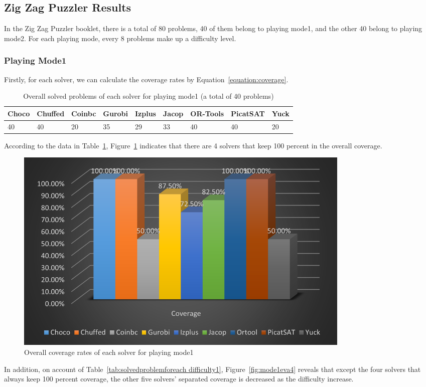 \subsection{Zig Zag Puzzler Results}
\label{sec:Zig Zag Puzzlerresult}
In the Zig Zag Puzzler booklet, there is a total of 80 problems, 40 of them belong to playing mode1, and the other 40 belong to playing mode2. For each playing mode, every 8 problems make up a difficulty level. 
\subsubsection{Playing Mode1}
Firstly, for each solver, we can calculate the coverage rates by Equation~\ref{equation:coverage}.
\begin{table}[htbp]
\centering
\caption{Overall solved problems of each solver for playing mode1 (a total of 40 problems)}
\label{tab:solvedproblem1}
\begin{tabular}{|l|l|l|l|l|l|l|l|l|}
\hline
Choco & Chuffed & Coinbc& Gurobi & Izplus&Jacop& OR-Tools& PicatSAT&Yuck \\
\hline
40   &40      & 20    & 35    &29     &33   &40    &40      &20\\
\hline
\end{tabular}
\end{table}
According to the data in Table~\ref{tab:solvedproblem1}, Figure~\ref{fig:mode1eva2} indicates that there are 4 solvers that keep 100 percent in the overall coverage.
\begin{figure}[H]
     \centering
    \includegraphics[width=0.8\textwidth]{figs/mode1coverage.png}
    \caption{Overall coverage rates of each solver for playing mode1}
    \label{fig:mode1eva2}
\end{figure}
In addition, on account of Table~\ref{tab:solvedproblemforeach difficulty1}, Figure~\ref{fig:mode1eva4} reveals that except the four solvers that always keep 100 percent coverage, the other five solvers' separated coverage is decreased as the difficulty increase.

